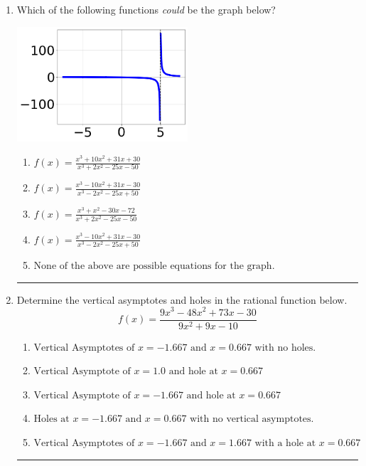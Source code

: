 \documentclass[14pt]{extbook}
\newcommand{\litem}[1]{\item#1\hspace*{-1cm}\rule{\textwidth}{0.4pt}}
\begin{document}
\begin{enumerate}
{\begin{enumerate}[label=\Alph*.]
\end{enumerate} }
\litem{
Which of the following functions \textit{could} be the graph below?
\begin{center}
    \includegraphics[width=0.5\textwidth]{../Figures/identifyGraphOfRationalFunctionCopyC.png}
\end{center}
\begin{enumerate}[label=\Alph*.]
\item \( f(x)=\frac{x^{3} +10 x^{2} +31 x + 30}{x^{3} +2 x^{2} -25 x -50} \)
\item \( f(x)=\frac{x^{3} -10 x^{2} +31 x -30}{x^{3} -2 x^{2} -25 x + 50} \)
\item \( f(x)=\frac{x^{3} + x^{2} -30 x -72}{x^{3} +2 x^{2} -25 x -50} \)
\item \( f(x)=\frac{x^{3} -10 x^{2} +31 x -30}{x^{3} -2 x^{2} -25 x + 50} \)
\item \( \text{None of the above are possible equations for the graph.} \)

\end{enumerate} }
\litem{
Determine the vertical asymptotes and holes in the rational function below.\[ f(x) = \frac{9x^{3} -48 x^{2} +73 x -30}{9x^{2} +9 x -10} \]\begin{enumerate}[label=\Alph*.]
\item \( \text{Vertical Asymptotes of } x = -1.667 \text{ and } x = 0.667 \text{ with no holes.} \)
\item \( \text{Vertical Asymptote of } x = 1.0 \text{ and hole at } x = 0.667 \)
\item \( \text{Vertical Asymptote of } x = -1.667 \text{ and hole at } x = 0.667 \)
\item \( \text{Holes at } x = -1.667 \text{ and } x = 0.667 \text{ with no vertical asymptotes.} \)
\item \( \text{Vertical Asymptotes of } x = -1.667 \text{ and } x = 1.667 \text{ with a hole at } x = 0.667 \)

\end{enumerate} }
\end{enumerate}
\end{document}
